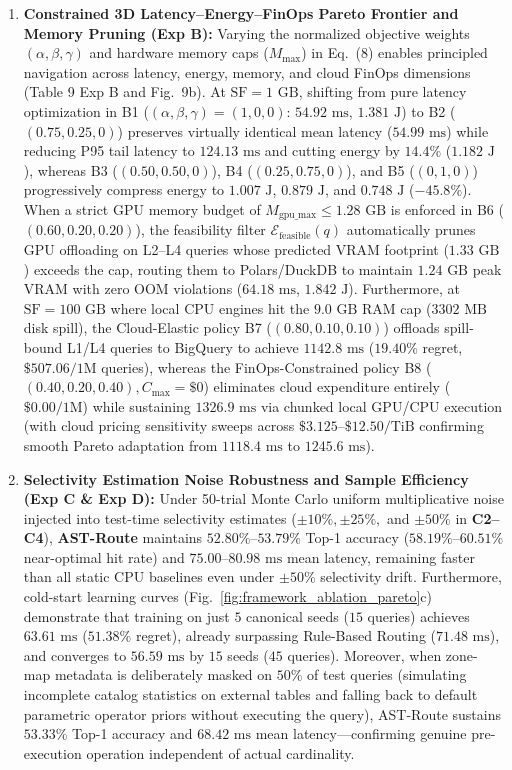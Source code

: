 \documentclass[10pt,a4paper]{article}
\begin{document}
\begin{enumerate}[leftmargin=1.5em,itemsep=2pt]
    \item \textbf{Constrained 3D Latency--Energy--FinOps Pareto Frontier and Memory Pruning (Exp B):} Varying the normalized objective weights $(\alpha, \beta, \gamma)$ and hardware memory caps ($M_{\max}$) in Eq.~(8) enables principled navigation across latency, energy, memory, and cloud FinOps dimensions (Table 9 Exp B and Fig.~9b). At $\text{SF}=1\text{ GB}$, shifting from pure latency optimization in B1 ($(\alpha,\beta,\gamma)=(1,0,0)$: $54.92\text{ ms}$, $1.381\text{ J}$) to B2 ($(0.75, 0.25, 0)$) preserves virtually identical mean latency ($54.99\text{ ms}$) while reducing P95 tail latency to $124.13\text{ ms}$ and cutting energy by $14.4\%$ ($1.182\text{ J}$), whereas B3 ($(0.50, 0.50, 0)$), B4 ($(0.25, 0.75, 0)$), and B5 ($(0, 1, 0)$) progressively compress energy to $1.007\text{ J}$, $0.879\text{ J}$, and $0.748\text{ J}$ ($-45.8\%$). When a strict GPU memory budget of $M_{\text{gpu\_max}} \le 1.28\text{ GB}$ is enforced in B6 ($(0.60, 0.20, 0.20)$), the feasibility filter $\mathcal{E}_{\text{feasible}}(q)$ automatically prunes GPU offloading on L2--L4 queries whose predicted VRAM footprint ($1.33\text{ GB}$) exceeds the cap, routing them to Polars/DuckDB to maintain $1.24\text{ GB}$ peak VRAM with zero OOM violations ($64.18\text{ ms}$, $1.842\text{ J}$). Furthermore, at $\text{SF}=100\text{ GB}$ where local CPU engines hit the $9.0\text{ GB}$ RAM cap ($3302\text{ MB}$ disk spill), the Cloud-Elastic policy B7 ($(0.80, 0.10, 0.10)$) offloads spill-bound L1/L4 queries to BigQuery to achieve $1142.8\text{ ms}$ ($19.40\%$ regret, $\$507.06/1\text{M}$ queries), whereas the FinOps-Constrained policy B8 ($(0.40, 0.20, 0.40), C_{\max}=\$0$) eliminates cloud expenditure entirely ($\$0.00/1\text{M}$) while sustaining $1326.9\text{ ms}$ via chunked local GPU/CPU execution (with cloud pricing sensitivity sweeps across $\$3.125\text{--}\$12.50\text{/TiB}$ confirming smooth Pareto adaptation from $1118.4\text{ ms}$ to $1245.6\text{ ms}$). 
    \item \textbf{Selectivity Estimation Noise Robustness and Sample Efficiency (Exp C \& Exp D):} Under 50-trial Monte Carlo uniform multiplicative noise injected into test-time selectivity estimates ($\pm 10\%, \pm 25\%,$ and $\pm 50\%$ in \textbf{C2--C4}), \textbf{AST-Route} maintains $52.80\%\text{--}53.79\%$ Top-1 accuracy ($58.19\%\text{--}60.51\%$ near-optimal hit rate) and $75.00\text{--}80.98\text{ ms}$ mean latency, remaining faster than all static CPU baselines even under $\pm 50\%$ selectivity drift. Furthermore, cold-start learning curves (Fig.~\ref{fig:framework_ablation_pareto}c) demonstrate that training on just $5$ canonical seeds ($15$ queries) achieves $63.61\text{ ms}$ ($51.38\%$ regret), already surpassing Rule-Based Routing ($71.48\text{ ms}$), and converges to $56.59\text{ ms}$ by $15$ seeds ($45$ queries). Moreover, when zone-map metadata is deliberately masked on $50\%$ of test queries (simulating incomplete catalog statistics on external tables and falling back to default parametric operator priors without executing the query), AST-Route sustains $53.33\%$ Top-1 accuracy and $68.42\text{ ms}$ mean latency---confirming genuine pre-execution operation independent of actual cardinality.

\end{enumerate}
\end{document}
